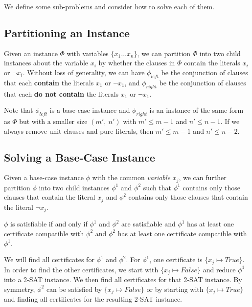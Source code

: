 We define some sub-problems and consider how to solve each of them.


\subsection{Partitioning an Instance}
\label{subsec:partitioning-an-instance}

Given an instance $\Phi$ with variables $\{ x_1 \dots x_n \}$, we can partition $\Phi$ into two child instances about the variable $x_i$ by whether the clauses in $\Phi$ contain the literals $x_i$ or $\lnot x_i$.
Without loss of generality, we can have $\phi_{left}$ be the conjunction of clauses that each \textbf{contain} the literals $x_1$ or $\lnot x_1$, and $\phi_{right}$ be the conjunction of clauses that each \textbf{do not contain} the literals $x_1$ or $\lnot x_1$.

Note that $\phi_{left}$ is a base-case instance and $\phi_{right}$ is an instance of the same form as $\Phi$ but with a smaller size $(m',~ n')$ with $m' \leq m - 1$ and $n' \leq n - 1$.
If we always remove unit clauses and pure literals, then $m' \leq m - 1$ and $n' \leq n - 2$.


\subsection{Solving a Base-Case Instance}
\label{subsec:solving-a-base-case-instance}

Given a base-case instance $\phi$ with the common \textit{variable} $x_j$, we can further partition $\phi$ into two child instances $\phi^1$ and $\phi^2$ such that $\phi^1$ contains only those clauses that contain the literal $x_j$ and $\phi^2$ contains only those clauses that contain the literal $\lnot x_j$.

$\phi$ is satisfiable if and only if $\phi^1$ and $\phi^2$ are satisfiable and $\phi^1$ has at least one certificate compatible with $\phi^2$ and $\phi^2$ has at least one certificate compatible with $\phi^1$.

We will find all certificates for $\phi^1$ and $\phi^2$.
For $\phi^1$, one certificate is $\{ x_j \mapsto True \}$.
In order to find the other certificates, we start with $\{ x_j \mapsto False \}$ and reduce $\phi^1$ into a 2-SAT instance.
We then find all certificates for that 2-SAT instance.
By symmetry, $\phi^2$ can be satisfied by $\{ x_j \mapsto False \}$ or by starting with $\{ x_j \mapsto True \}$ and finding all certificates for the resulting 2-SAT instance.



